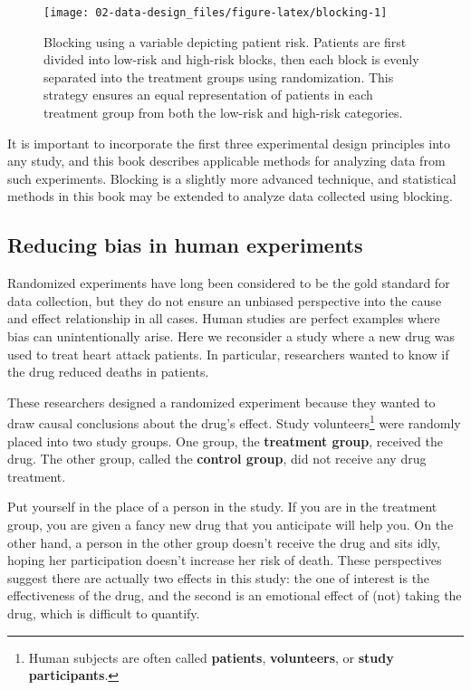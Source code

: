 \documentclass[
  10pt,
  openany]{book}
\begin{document}
\begin{figure}[h]

{\centering \texttt{[image: 02-data-design\_files/figure-latex/blocking-1]} 

}

\caption{Blocking using a variable depicting patient risk. Patients are first divided into low-risk and high-risk blocks, then each block is evenly separated into the treatment groups using randomization. This strategy ensures an equal representation of patients in each treatment group from both the low-risk and high-risk categories.}\label{fig:blocking}
\end{figure}

It is important to incorporate the first three experimental design principles into any study, and this book describes applicable methods for analyzing data from such experiments.
Blocking is a slightly more advanced technique, and statistical methods in this book may be extended to analyze data collected using blocking.

\clearpage

\hypertarget{reducing-bias-human-experiments}{%
\subsection{Reducing bias in human experiments}\label{reducing-bias-human-experiments}}

Randomized experiments have long been considered to be the gold standard for data collection, but they do not ensure an unbiased perspective into the cause and effect relationship in all cases.
Human studies are perfect examples where bias can unintentionally arise.
Here we reconsider a study where a new drug was used to treat heart attack patients.
In particular, researchers wanted to know if the drug reduced deaths in patients.

These researchers designed a randomized experiment because they wanted to draw causal conclusions about the drug's effect.
Study volunteers\footnote{Human subjects are often called \textbf{patients}, \textbf{volunteers}, or \textbf{study participants}.} were randomly placed into two study groups.
One group, the \textbf{treatment group}, received the drug.
The other group, called the \textbf{control group}, did not receive any drug treatment.

Put yourself in the place of a person in the study.
If you are in the treatment group, you are given a fancy new drug that you anticipate will help you.
On the other hand, a person in the other group doesn't receive the drug and sits idly, hoping her participation doesn't increase her risk of death.
These perspectives suggest there are actually two effects in this study: the one of interest is the effectiveness of the drug, and the second is an emotional effect of (not) taking the drug, which is difficult to quantify.
\end{document}
